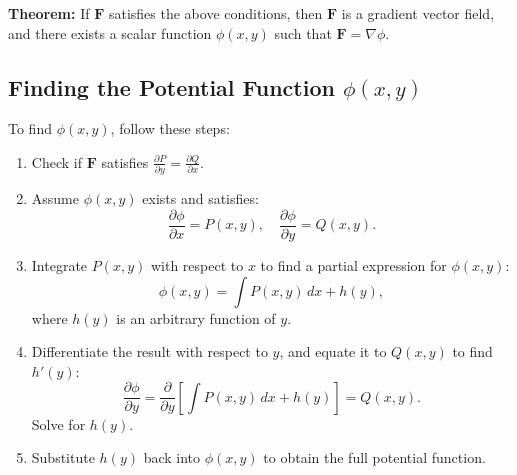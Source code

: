 \documentclass{report}
\begin{document}
\textbf{Theorem:} If \( \mathbf{F} \) satisfies the above conditions, then \( \mathbf{F} \) is a gradient vector field, and there exists a scalar function \( \phi(x, y) \) such that \( \mathbf{F} = \nabla \phi \).

\subsection{Finding the Potential Function \( \phi(x, y) \)}
To find \( \phi(x, y) \), follow these steps:
\begin{enumerate}
    \item Check if \( \mathbf{F} \) satisfies \( \frac{\partial P}{\partial y} = \frac{\partial Q}{\partial x} \).
    \item Assume \( \phi(x, y) \) exists and satisfies:
    \[
    \frac{\partial \phi}{\partial x} = P(x, y), \quad \frac{\partial \phi}{\partial y} = Q(x, y).
    \]
    \item Integrate \( P(x, y) \) with respect to \( x \) to find a partial expression for \( \phi(x, y) \):
    \[
    \phi(x, y) = \int P(x, y) \, dx + h(y),
    \]
    where \( h(y) \) is an arbitrary function of \( y \).
    \item Differentiate the result with respect to \( y \), and equate it to \( Q(x, y) \) to find \( h'(y) \):
    \[
    \frac{\partial \phi}{\partial y} = \frac{\partial}{\partial y} \left[ \int P(x, y) \, dx + h(y) \right] = Q(x, y).
    \]
    Solve for \( h(y) \).
    \item Substitute \( h(y) \) back into \( \phi(x, y) \) to obtain the full potential function.
\end{enumerate}

\end{document}
